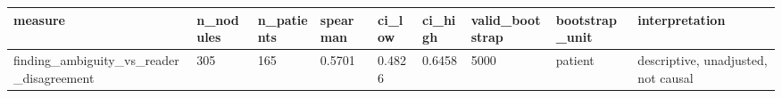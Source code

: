\begin{tabular}{lllllllll}
\hline
measure & n\_nodules & n\_patients & spearman & ci\_low & ci\_high & valid\_bootstrap & bootstrap\_unit & interpretation \\
\hline
finding\_ambiguity\_vs\_reader\_disagreement & 305 & 165 & 0.5701 & 0.4826 & 0.6458 & 5000 & patient & descriptive, unadjusted, not causal \\
\hline
\end{tabular}
